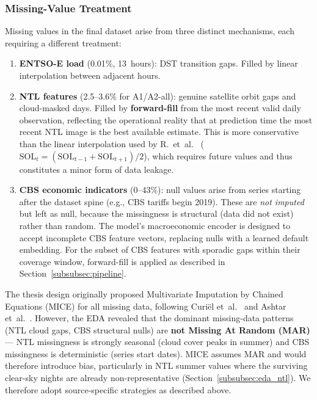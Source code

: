 \subsubsection{Missing-Value Treatment}
\label{subsubsec:missing_values}

Missing values in the final dataset arise from three distinct mechanisms, each requiring a different treatment:

\begin{enumerate}
    \item \textbf{ENTSO-E load} (0.01\%, 13~hours): DST transition gaps. Filled by linear interpolation between adjacent hours.

    \item \textbf{NTL features} (2.5--3.6\% for A1/A2-all): genuine satellite orbit gaps and cloud-masked days. Filled by \textbf{forward-fill} from the most recent valid daily observation, reflecting the operational reality that at prediction time the most recent NTL image is the best available estimate. This is more conservative than the linear interpolation used by R.~et~al.~\cite{r_forecasting_2025} ($\text{SOL}_t = (\text{SOL}_{t-1} + \text{SOL}_{t+1})/2$), which requires future values and thus constitutes a minor form of data leakage.

    \item \textbf{CBS economic indicators} (0--43\%): null values arise from series starting after the dataset spine (e.g., CBS tariffs begin 2019). These are \emph{not imputed} but left as null, because the missingness is structural (data did not exist) rather than random. The model's macroeconomic encoder is designed to accept incomplete CBS feature vectors, replacing nulls with a learned default embedding. For the subset of CBS features with sporadic gaps within their coverage window, forward-fill is applied as described in Section~\ref{subsubsec:pipeline}.
\end{enumerate}

The thesis design originally proposed Multivariate Imputation by Chained Equations (MICE) for all missing data, following Curi\"el et~al.~\cite{curiel_integrating_2025} and Ashtar et~al.~\cite{ashtar_hybrid_2025}. However, the EDA revealed that the dominant missing-data patterns (NTL cloud gaps, CBS structural nulls) are \textbf{not Missing At Random (MAR)} — NTL missingness is strongly seasonal (cloud cover peaks in summer) and CBS missingness is deterministic (series start dates). MICE assumes MAR and would therefore introduce bias, particularly in NTL summer values where the surviving clear-sky nights are already non-representative (Section~\ref{subsubsec:eda_ntl}). We therefore adopt source-specific strategies as described above.

